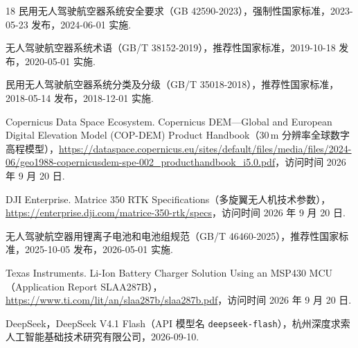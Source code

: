\begin{thebibliography}{18}
民用无人驾驶航空器系统安全要求（GB 42590-2023），强制性国家标准，2023-05-23 发布，2024-06-01 实施.

无人驾驶航空器系统术语（GB/T 38152-2019），推荐性国家标准，2019-10-18 发布，2020-05-01 实施.

民用无人驾驶航空器系统分类及分级（GB/T 35018-2018），推荐性国家标准，2018-05-14 发布，2018-12-01 实施.


Copernicus Data Space Ecosystem. Copernicus DEM—Global and European Digital Elevation Model (COP-DEM) Product Handbook（30\,m 分辨率全球数字高程模型），\url{https://dataspace.copernicus.eu/sites/default/files/media/files/2024-06/geo1988-copernicusdem-spe-002_producthandbook_i5.0.pdf}，访问时间 2026 年 9 月 20 日.

DJI Enterprise. Matrice 350 RTK Specifications（多旋翼无人机技术参数），\url{https://enterprise.dji.com/matrice-350-rtk/specs}，访问时间 2026 年 9 月 20 日.

无人驾驶航空器用锂离子电池和电池组规范（GB/T 46460-2025），推荐性国家标准，2025-10-05 发布，2026-05-01 实施.

Texas Instruments. Li-Ion Battery Charger Solution Using an MSP430 MCU（Application Report SLAA287B），\url{https://www.ti.com/lit/an/slaa287b/slaa287b.pdf}，访问时间 2026 年 9 月 20 日.


DeepSeek，DeepSeek V4.1 Flash（API 模型名 \texttt{deepseek-flash}），杭州深度求索人工智能基础技术研究有限公司，2026-09-10.

\end{thebibliography}
